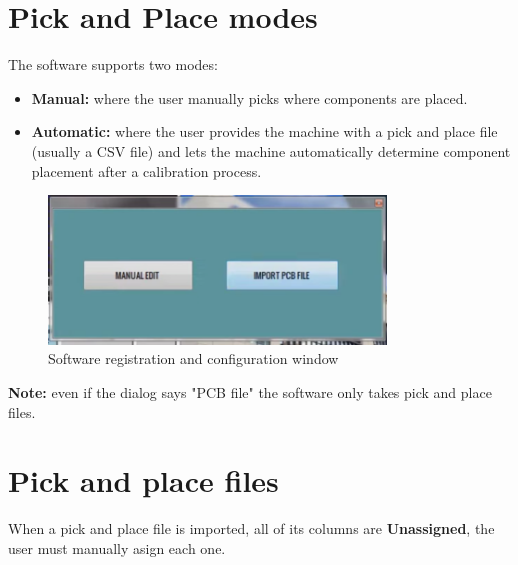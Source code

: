 \documentclass[a4paper,10pt]{report}
\begin{document}
\section{Pick and Place modes}
The software supports two modes:
\begin{itemize}
 \item \textbf{Manual: } where the user manually picks where components are placed.
 \item \textbf{Automatic: } where the user provides the machine with a pick and place file (usually a CSV file) and lets the machine automatically determine component placement after a calibration process.
\end{itemize}
\begin{figure}[!htb]
 \centering
 \includegraphics[width=0.8\textwidth]{images/scrot3.png}
 \caption{Software registration and configuration window}
\end{figure}
\textbf{Note: } even if the dialog says "PCB file" the software only takes pick and place files.
\newpage
\section{Pick and place files}
When a pick and place file is imported, all of its columns are \textbf{Unassigned}, the user must manually asign each one.\\
\end{document}
